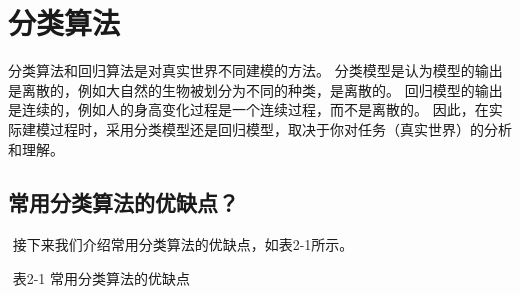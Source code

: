 \section{ 分类算法}
\label{ux5206ux7c7bux7b97ux6cd5}
分类算法和回归算法是对真实世界不同建模的方法。
分类模型是认为模型的输出是离散的，例如大自然的生物被划分为不同的种类，是离散的。
回归模型的输出是连续的，例如人的身高变化过程是一个连续过程，而不是离散的。
因此，在实际建模过程时，采用分类模型还是回归模型，取决于你对任务（真实世界）的分析和理解。

\subsection{常用分类算法的优缺点？}
\label{ux5e38ux7528ux5206ux7c7bux7b97ux6cd5ux7684ux4f18ux7f3aux70b9}

​ 接下来我们介绍常用分类算法的优缺点，如表2-1所示。

​ 表2-1 常用分类算法的优缺点


